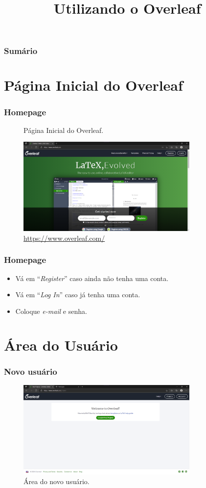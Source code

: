 \documentclass[brazilian]{beamer}
\title{Utilizando o Overleaf}
\begin{document}
\frame{\titlepage}

\begin{frame}
    \frametitle{Sumário}
    \tableofcontents
\end{frame}

\section[Página Inicial]{Página Inicial do Overleaf}
\begin{frame}
    \frametitle{Homepage}
    \begin{figure}
        \centering
        \caption[HomePage]{Página Inicial do Overleaf.}
        \label{fig:homepageOverleaf}
        \includegraphics[width=0.8\textwidth]{../images/homepageOverleaf.png}
        \caption*{\footnotesize \url{https://www.overleaf.com/}}
    \end{figure}
\end{frame}

\begin{frame}
    \frametitle{Homepage}
    \begin{itemize}
        \item Vá em ``\textit{Register}'' caso ainda não tenha uma conta.
        \item Vá em ``\textit{Log In}'' caso já tenha uma conta.
        \item Coloque \textit{e-mail} e senha.
    \end{itemize}
\end{frame}

\section{Área do Usuário}
\begin{frame}
    \frametitle{Novo usuário}
    \begin{figure}
        \centering
        \caption{Área do novo usuário.}
        \label{fig:newUserOverleaf}
        \includegraphics[width=0.8\textwidth]{../images/newUserOverleaf.png}
    \end{figure}
\end{frame}
\end{document}
